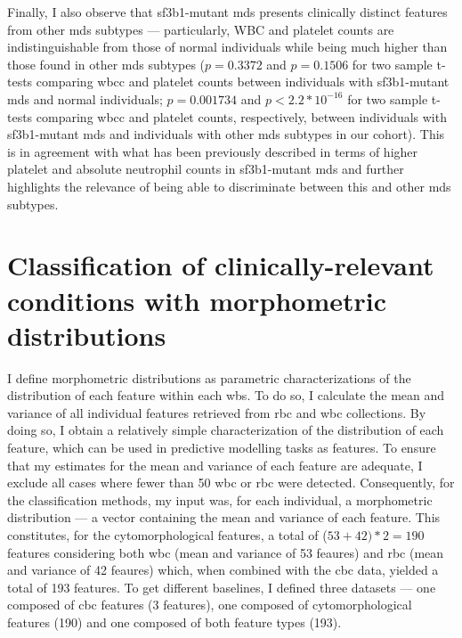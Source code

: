 \begin{figure}[!ht]
    \label{fig:mds-hb}
\end{figure}

\begin{figure}[!ht]
    \label{fig:mds-plt}
\end{figure}

Finally, I also observe that \ac{sf3b1}-mutant \ac{mds} presents clinically distinct features from other \ac{mds} subtypes --- particularly, WBC and platelet counts are indistinguishable from those of normal individuals while being much higher than those found in other \ac{mds} subtypes ($p=0.3372$ and $p=0.1506$ for two sample t-tests comparing \ac{wbcc} and platelet counts between individuals with \ac{sf3b1}-mutant \ac{mds} and normal individuals; $p=0.001734$ and $p<2.2*10^{-16}$ for two sample t-tests comparing \ac{wbcc} and platelet counts, respectively, between individuals with \ac{sf3b1}-mutant \ac{mds} and individuals with other \ac{mds} subtypes in our cohort). This is in agreement with what has been previously described in terms of higher platelet and absolute neutrophil counts in \ac{sf3b1}-mutant \ac{mds} \cite{Malcovati2015-tz,Malcovati2020-no} and further highlights the relevance of being able to discriminate between this and other \ac{mds} subtypes. 

\section{Classification of clinically-relevant conditions with morphometric distributions}

I define morphometric distributions as parametric characterizations of the distribution of each feature within each \ac{wbs}. To do so, I calculate the mean and variance of all individual features retrieved from \ac{rbc} and \ac{wbc} collections. By doing so, I obtain a relatively simple characterization of the distribution of each feature, which can be used in predictive modelling tasks as features. To ensure that my estimates for the mean and variance of each feature are adequate, I exclude all cases where fewer than 50 \ac{wbc} or \ac{rbc} were detected. Consequently, for the classification methods, my input was, for each individual, a morphometric distribution --- a vector containing the mean and variance of each feature. This constitutes, for the cytomorphological features, a total of ($53 + 42) * 2 = 190$ features considering both \ac{wbc} (mean and variance of 53 feaures) and \ac{rbc} (mean and variance of 42 feaures) which, when combined with the \ac{cbc} data, yielded a total of 193 features. To get different baselines, I defined three datasets --- one composed of \ac{cbc} features (3 features), one composed of cytomorphological features (190) and one composed of both feature types (193). 

